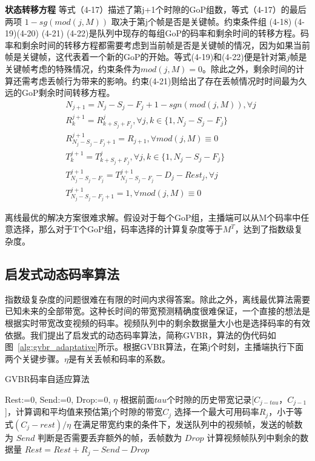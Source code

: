 \textbf{状态转移方程} 等式（4-17）描述了第j+1个时隙的GoP组数，等式（4-17）的最后两项 $1-sg(mod(j,M))$ 取决于第j个帧是否是关键帧。约束条件组 (4-18) (4-19)(4-20) (4-21) (4-22)是队列中现存的每组GoP的码率和剩余时间的转移方程。码率和剩余时间的转移方程都需要考虑到当前帧是否是关键帧的情况，因为如果当前帧是关键帧，这代表着一个新的GoP的开始。等式(4-19)和(4-22)便是针对第$j$帧是关键帧考虑的特殊情况，约束条件为$mod(j,M)=0$。除此之外，剩余时间的计算还需考虑丢帧行为带来的影响。约束(4-21)则给出了存在丢帧情况时时间最为久远的GoP剩余时间转移方程。
\begin{align}
  & N_{j+1}=N_j-S_j-F_j+1-sgn(mod(j,M)), \forall j \\
  & R_k^{j+1}=R_{k+S_j+F_j}^j, \forall j, k\in \{1,N_j-S_j-F_j\} \\
  & R_{N_j-S_j-F_j+1}^{j+1} = R_{j+1}, \forall mod(j,M) \equiv 0 \\
  & T_k^{j+1} = T_{k+S_j+F_j}^j, \forall j, k\in\{1, N_j-S_j-F_j\} \\
  & T_{N_j-S_j-F_j}^{j+1} = T_{N_j-S_j-F_j}^{j+1} - D_j - Rest_j , \forall j \\
  & T_{N_j-S_j-F_j+1}^{j+1}=1, \forall mod(j,M)\equiv 0
\end{align}

离线最优的解决方案很难求解。假设对于每个GoP组，主播端可以从M个码率中任意选择，那么对于T个GoP组，码率选择的计算复杂度等于$M^T$，达到了指数级复杂度。

\subsection{启发式动态码率算法}
指数级复杂度的问题很难在有限的时间内求得答案。除此之外，离线最优算法需要已知未来的全部带宽。这种长时间的带宽预测精确度很难保证，一个直接的想法是根据实时带宽改变视频的码率。视频队列中的剩余数据量大小也是选择码率的有效依据。我们提出了启发式的动态码率算法，简称GVBR，算法的伪代码如图~\ref{alg:gvbr_adaptative}所示。根据GVBR算法，在第j个时刻，主播端执行下面两个关键步骤。$\eta$是有关丢帧和码率的系数。

\begin{algorithm}[htb]
\caption{GVBR码率自适应算法}
\label{alg:gvbr_adaptative}
\begin{algorithmic}[1]
\State Rest:=0, Send:=0, Drop:=0, $\eta$
\State 根据前面$tau$个时隙的历史带宽记录[$C_{j-tau}$，$C_{j-1}$]，计算调和平均值来预估第j个时隙的带宽$C_j$
\State 选择一个最大可用码率$R_j$，小于等式$(C_j-rest)/\eta$
\State 在满足带宽约束的条件下，发送队列中的视频帧，发送的帧数为 $Send$
\State 判断是否需要丢弃额外的帧，丢帧数为 $Drop$
\State 计算视频帧队列中剩余的数据量 $Rest=Rest+R_j-Send-Drop$
\EndFor
\end{algorithmic}
\end{algorithm}

